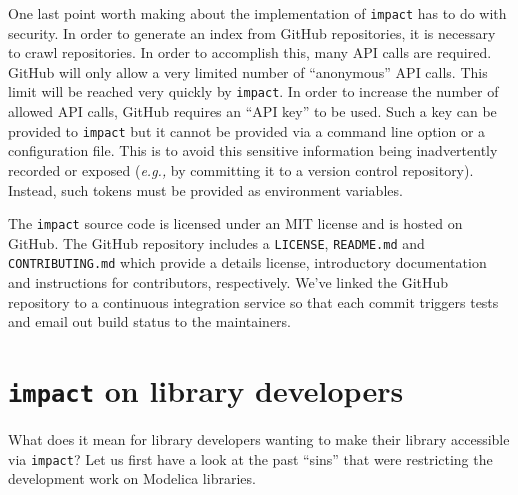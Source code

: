 \documentclass[11pt,a4paper,twocolumn]{article}
\newcommand{\code}[1]{\texttt{#1}} %
\begin{document}
One last point worth making about the implementation of \code{impact}
has to do with security.  In order to generate an index from GitHub
repositories, it is necessary to crawl repositories.  In order to
accomplish this, many API calls are required.  GitHub will only allow
a very limited number of ``anonymous'' API calls.  This limit will be
reached very quickly by \code{impact}.  In order to increase the
number of allowed API calls, GitHub requires an ``API key'' to be
used.  Such a key can be provided to \code{impact} but it cannot be
provided via a command line option or a configuration file.  This is
to avoid this sensitive information being inadvertently recorded or
exposed ({\it e.g.,} by committing it to a version control
repository).  Instead, such tokens must be provided as environment
variables.

The \code{impact} source code is licensed under an MIT license and is
hosted on GitHub.  The GitHub repository includes a \code{LICENSE},
\code{README.md} and \code{CONTRIBUTING.md} which provide a details
license, introductory documentation and instructions for contributors,
respectively.  We've linked the GitHub repository to a continuous
integration service so that each commit triggers tests and email out
build status to the maintainers.

\section{\code{impact} on library developers}

What does it mean for library developers wanting to make their library
accessible via \code{impact}? Let us first have a look at the past
``sins'' that were restricting the development work on Modelica
libraries.
\end{document}
